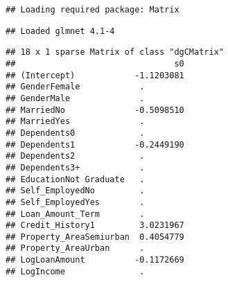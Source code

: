 \documentclass[
]{article}
\newenvironment{Shaded}{\begin{snugshade}}{\end{snugshade}}
\newcommand{\AttributeTok}[1]{\textcolor[rgb]{0.77,0.63,0.00}{#1}}
\newcommand{\CommentTok}[1]{\textcolor[rgb]{0.56,0.35,0.01}{\textit{#1}}}
\newcommand{\DecValTok}[1]{\textcolor[rgb]{0.00,0.00,0.81}{#1}}
\newcommand{\FunctionTok}[1]{\textcolor[rgb]{0.00,0.00,0.00}{#1}}
\newcommand{\NormalTok}[1]{#1}
\newcommand{\OtherTok}[1]{\textcolor[rgb]{0.56,0.35,0.01}{#1}}
\newcommand{\SpecialCharTok}[1]{\textcolor[rgb]{0.00,0.00,0.00}{#1}}
\newcommand{\StringTok}[1]{\textcolor[rgb]{0.31,0.60,0.02}{#1}}
\begin{document}
\begin{verbatim}
## Loading required package: Matrix
\end{verbatim}

\begin{verbatim}
## Loaded glmnet 4.1-4
\end{verbatim}

\begin{Shaded}
\end{Shaded}

\begin{verbatim}
## 18 x 1 sparse Matrix of class "dgCMatrix"
##                                s0
## (Intercept)            -1.1203081
## GenderFemale            .        
## GenderMale              .        
## MarriedNo              -0.5098510
## MarriedYes              .        
## Dependents0             .        
## Dependents1            -0.2449190
## Dependents2             .        
## Dependents3+            .        
## EducationNot Graduate   .        
## Self_EmployedNo         .        
## Self_EmployedYes        .        
## Loan_Amount_Term        .        
## Credit_History1         3.0231967
## Property_AreaSemiurban  0.4054779
## Property_AreaUrban      .        
## LogLoanAmount          -0.1172669
## LogIncome               .
\end{verbatim}
\end{document}
